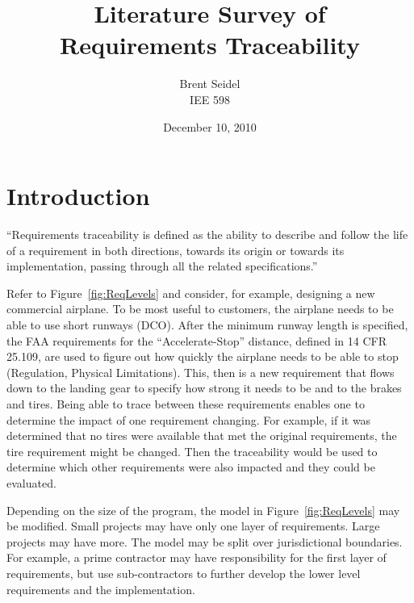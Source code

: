 \documentclass[10pt, openany]{report}
\title{Literature Survey of\\Requirements Traceability}
\author{Brent Seidel\\IEE 598}
\date{December 10, 2010}
\begin{document}
\maketitle
\tableofcontents
\listoffigures
{}

\chapter{Introduction}
``Requirements traceability is defined as the ability to describe and follow the life of a requirement in both directions, towards its origin or towards its implementation, passing through all the related specifications.''\cite{req7}

Refer to Figure~\ref{fig:ReqLevels} and consider, for example, designing a new commercial airplane.  To be most useful to customers, the airplane needs to be able to use short runways (DCO).  After the minimum runway length is specified, the FAA requirements for the ``Accelerate-Stop'' distance, defined in 14 CFR 25.109, are used to figure out how quickly the airplane needs to be able to stop (Regulation, Physical Limitations).  This, then is a new requirement that flows down to the landing gear to specify how strong it needs to be and to the brakes and tires.  Being able to trace between these requirements enables one to determine the impact of one requirement changing.  For example, if it was determined that no tires were available that met the original requirements, the tire requirement might be changed.  Then the traceability would be used to determine which other requirements were also impacted and they could be evaluated.

Depending on the size of the program, the model in Figure~\ref{fig:ReqLevels} may be modified.  Small projects may have only one layer of requirements.  Large projects may have more.  The model may be split over jurisdictional boundaries.  For example, a prime contractor may have responsibility for the first layer of requirements, but use sub-contractors to further develop the lower level requirements and the implementation.
\end{document}
